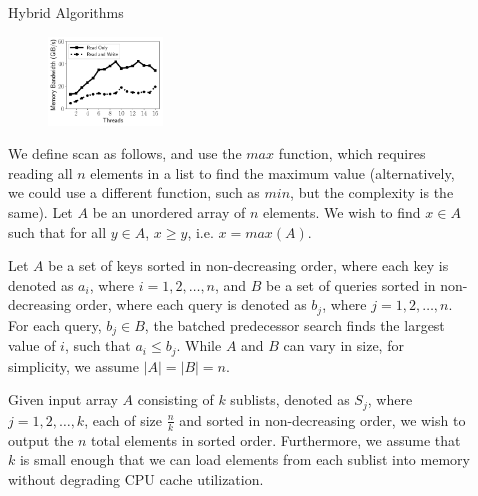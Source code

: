 \documentclass[final]{beamer}
\newlength{\sepwidth}
\newlength{\colwidth}
\newcommand{\separatorcolumn}{\begin{column}{\sepwidth}\end{column}}
\begin{document}
\begin{frame}[t]
\begin{columns}[t]
\begin{column}{\colwidth}
\begin{block}{Hybrid Algorithms}
\begin{figure}[htp]
\centering
    \includegraphics[height=0.2\textwidth, width=0.30\textwidth, trim={0.5cm 0.5cm 0.5cm 1cm}]{figures/microbenchmarks_time_vs_threads.pdf}	
   \label{fig:mem_bandwidth_scalability}
\end{figure}


We define scan as follows, and use the $max$ function, which requires reading all $n$ elements in a list to find the maximum value (alternatively,
we could use a different function, such as $min$, but the complexity is the same).
Let $A$ be an unordered array of $n$ elements. We wish to find $x \in A$ such that for all $y \in A$, $x \ge y$, i.e. $x = max(A)$.


   Let $A$ be a set of keys sorted in non-decreasing order,  
   where each key is denoted as $a_i$, where $i=1, 2,\ldots,n$, and $B$ be a set of queries sorted in non-decreasing order, 
   where each query is denoted as $b_j$, where $j=1, 2,\ldots,n$. For each query, $b_j\in B$, the batched predecessor search 
   finds the largest value of $i$, such that $a_i\leq b_j$. While $A$ and $B$ can vary in size, for simplicity, we assume $|A|=|B|=n$.


   Given input array $A$ consisting of $k$ sublists, denoted as $S_j$, 
   where $j=1, 2,\ldots,k$, each of size  $\frac{n}{k}$ and sorted in non-decreasing order, we wish to output the $n$ total elements 
   in sorted order. Furthermore, we assume that $k$ is small enough that we can load elements 
   from each sublist into memory without degrading CPU cache utilization.

  \end{block}

\end{column}

\separatorcolumn

\begin{column}{\colwidth}


\end{column}
\end{columns}
\end{frame}
\end{document}
